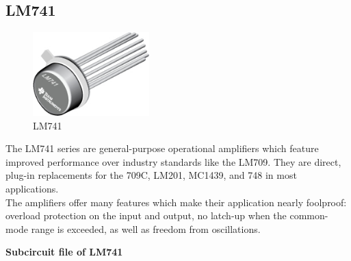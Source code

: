 \documentclass[12pt,a4paper]{report}
\begin{document}
\subsection{LM741}
\begin{figure} %
	\centering
	\includegraphics[width=0.4\textwidth]{lm741}
	\caption{LM741}
\end{figure}
The LM741 series are general-purpose operational amplifiers which feature improved performance over industry standards like the LM709. They are direct, plug-in replacements for the 709C, LM201, MC1439, and 748 in most applications.
\\
The amplifiers offer many features which make their application nearly foolproof: overload protection on the input and output, no latch-up when the common-mode range is exceeded, as well as freedom from oscillations.
\vspace{5mm}
\\
\begin{flushleft}
\textbf{Subcircuit file of LM741}
\end{flushleft}
\end{document}
